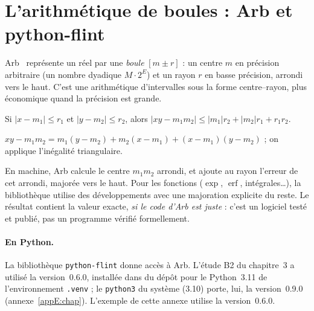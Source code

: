\section{L'arithmétique de boules : Arb et python-flint}\label{appD:sec:boules}

Arb~\cite{ch3-arb} représente un réel par une \emph{boule} $[m\pm r]$ : un centre $m$ en précision arbitraire (un
nombre dyadique $M\cdot2^E$) et un rayon $r$ en basse précision, arrondi vers le haut. C'est une arithmétique
d'intervalles sous la forme centre--rayon, plus économique quand la précision est grande.

\begin{proposition}\label{appD:prop:produit}
Si $|x-m_1|\le r_1$ et $|y-m_2|\le r_2$, alors $|xy-m_1m_2|\le|m_1|r_2+|m_2|r_1+r_1r_2$.
\end{proposition}

\begin{humanproof}
$xy-m_1m_2=m_1(y-m_2)+m_2(x-m_1)+(x-m_1)(y-m_2)$ ; on applique l'inégalité triangulaire.
\end{humanproof}
En machine, Arb calcule le centre $m_1m_2$ arrondi, et ajoute au rayon l'erreur de cet arrondi, majorée vers le haut.
Pour les fonctions ($\exp$, $\operatorname{erf}$, intégrales\ldots), la bibliothèque utilise des développements avec
une majoration explicite du reste. Le résultat contient la valeur exacte, \emph{si le code d'Arb est juste} : c'est un
logiciel testé et publié, pas un programme vérifié formellement.

\paragraph{En Python.} La bibliothèque \texttt{python-flint} donne accès à Arb. L'étude B2 du chapitre~3 a utilisé la
version~0.6.0, installée dans  du dépôt pour le Python~3.11 de l'environnement
\texttt{.venv} ; le \texttt{python3} du système (3.10) porte, lui, la version~0.9.0 (annexe~\ref{appE:chap}). L'exemple
de cette annexe utilise la version~0.6.0.

